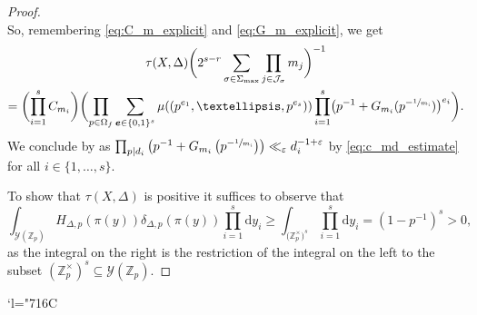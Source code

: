 \documentclass[11pt]{article}
\numberwithin{equation}{section}
\newcommand{\Changelback}{\mathcode`l="716C}
\let\epsilon\varepsilon
\newcommand{\bfe}{\boldsymbol{e}}
\newcommand\ZZ{\mathbb{Z}}
\newcommand{\ii}[1]{\mathcal{J}_{#1}}
\theoremstyle{definition}
\numberwithin{theorem}{section}
\begin{document}
\begin{proof}
\[\]
So, remembering \eqref{eq:C_m_explicit} and \eqref{eq:G_m_explicit}, we get
\begin{multline*}
\tau({X,\Delta})
\biggl(2^{s-r}\sum_{\sigma\in\Sigma_{\max}}\prod_{j\in\ii{\sigma}} m_j\biggr)^{-1}
\\
=
\biggl(\prod_{i=1}^s C_{m_i}\biggr)
\biggl (
\prod_{p\in\Omega_f}\sum_{\bfe\in\{0,1\}^s} \mu ((p^{e_1},\dots,p^{e_s}))
\prod_{i=1}^s\bigl (p^{-1}+G_{m_i} (p^{-\sfrac 1{m_i}})\bigr)^{e_i}
\biggr).
\end{multline*}
We conclude by \cite[Lem.\,11.15(e)]{MR1679841} as
$\prod_{p\mid d_i}\left(p^{-1}+G_{m_i}\left(p^{-\sfrac 1{m_i}}\right)\right)\ll_\epsilon d_i^{-1+\epsilon}$
by \eqref{eq:c_md_estimate} for all $i\in\{1,\dots,s\}$.

To show that $\tau({X,\Delta})$ is positive it suffices to observe that
\[
\int_{\mathscr Y(\ZZ_p)}H_{\Delta,p}(\pi(y))\delta_{\Delta,p} (\pi(y)) \prod_{i=1}^s\mathrm d y_i
\geq
\int_{\mathscr (\ZZ_p^\times)^s} \prod_{i=1}^s\mathrm d y_i =(1-p^{-1})^s >0,
\]
as the integral on the right is the restriction of the integral on the left to the subset
$(\ZZ_p^\times)^s \subseteq \mathscr Y(\ZZ_p)$.
\end{proof}

\Changelback

\end{document}
